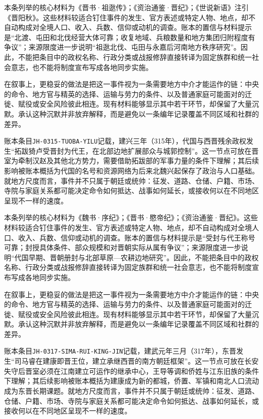 本条列举的核心材料为《晋书·祖逖传》；《资治通鉴·晋纪》；《世说新语》注引《晋阳秋》。这些材料较适合钉住事件的发生、官方表述或特定人物、地点，却不自动构成对全境人口、收入、兵数、信仰或动机的调查。账本的置信与材料提示是“北渡、屯田和北伐经营大体可靠；收复地域、兵粮数量和地方集团归附程度有争议”；来源限度进一步说明“祖逖北伐、屯田与永嘉后河南地方秩序研究”。因此，不能把条目中的政权名称、行政分类或战报修辞直接转译为固定族群和统一社会意志，也不能将制度宣布写成各地同步实施。

在叙事上，更稳妥的做法是把这一事件视为一条需要地方中介才能运作的链：中央的命令、地方官与精英的选择、运输与劳力的条件、以及普通家庭可能面对的迁徙、赋役或安全风险彼此相连。现有材料能够显示其中若干环节，却保留了大量沉默。承认这种沉默并非放弃解释，而是避免以一条编年记录覆盖不同区域和社群的差异。

账本条目\texttt{JH-0315-TUOBA-YILU}记载，建兴三年（315年），代国与西晋残余政权发生“拓跋猗卢受晋封为代王，在北部边地扩展部众与城郭控制”。这一节点可放在晋室为牵制汉赵及其他北方势力，需要借助拓跋部的军事力量的条件下理解；其后续影响被账本概括为代国的名号和资源网络为后来北魏兴起保存了政治与人口基础。就地方尺度而言，事件并不只属于朝廷或统帅：征发、道路、仓储、户籍、市场、寺院与家庭关系都可能决定命令如何抵达、战事如何延长，或接收何以在不同地区呈现不一样的速度。

本条列举的核心材料为《魏书·序纪》；《晋书·愍帝纪》；《资治通鉴·晋纪》。这些材料较适合钉住事件的发生、官方表述或特定人物、地点，却不自动构成对全境人口、收入、兵数、信仰或动机的调查。账本的置信与材料提示是“受封与代王称号可靠；封授具体条件、部众规模和对晋朝实际从属有争议”；来源限度进一步说明“代国早期、晋朝册封与北部草原—农耕边地研究”。因此，不能把条目中的政权名称、行政分类或战报修辞直接转译为固定族群和统一社会意志，也不能将制度宣布写成各地同步实施。

在叙事上，更稳妥的做法是把这一事件视为一条需要地方中介才能运作的链：中央的命令、地方官与精英的选择、运输与劳力的条件、以及普通家庭可能面对的迁徙、赋役或安全风险彼此相连。现有材料能够显示其中若干环节，却保留了大量沉默。承认这种沉默并非放弃解释，而是避免以一条编年记录覆盖不同区域和社群的差异。

账本条目\texttt{JH-0317-SIMA-RUI-KING-JIN}记载，建武元年三月（317年），东晋发生“司马睿在建康即晋王位，建立承继西晋的南方朝廷框架”。这一节点可放在长安失守后晋室必须在江南建立可运作的继承中心，王导等调和侨姓与江东旧族的条件下理解；其后续影响被账本概括为建康成为新的都城，侨置、军镇和南北人口流动成为东晋长期课题。就地方尺度而言，事件并不只属于朝廷或统帅：征发、道路、仓储、户籍、市场、寺院与家庭关系都可能决定命令如何抵达、战事如何延长，或接收何以在不同地区呈现不一样的速度。

